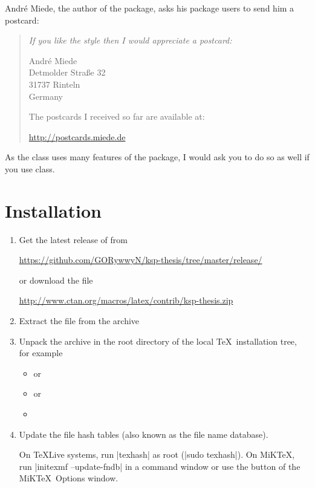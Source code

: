 \pagebreak %
André Miede, the author of the  package, asks his package users to send him a postcard:
\begin{quote}\itshape
   If you like the style then I would appreciate a postcard:
   \begin{center}
    André Miede \\
    Detmolder Straße 32 \\
    31737 Rinteln \\
    Germany
   \end{center}
   The postcards I received so far are available at:
   \begin{center}
    \url{http://postcards.miede.de}
   \end{center}
\end{quote}
As the  class uses many features of the  package, I would ask you to do so as well if you use  class.

\section{Installation}

\begin{enumerate}
   \item Get the latest release of  from

      \url{https://github.com/GORywwyN/ksp-thesis/tree/master/release/}

   or download the file

      \url{http://www.ctan.org/macros/latex/contrib/ksp-thesis.zip}
      
   \item Extract the file  from the archive

   \item Unpack the  archive in the root directory of the local \TeX\ installation tree, for example
   
   \begin{itemize}
      \item {} or
      \item {} or
      \item {}
   \end{itemize}

\item Update the file hash tables (also known as the file name database).
   
   On \TeX Live systems, run |texhash| as root (|sudo texhash|). On MiK\TeX, run |initexmf --update-fndb| in a command window or use the  button of the MiK\TeX\ Options window.
\end{enumerate}

